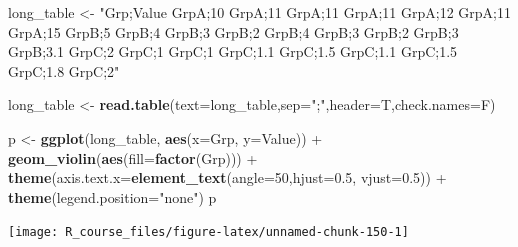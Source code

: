 \documentclass[]{article}
\newenvironment{Shaded}{\begin{snugshade}}{\end{snugshade}}
\newcommand{\KeywordTok}[1]{\textcolor[rgb]{0.13,0.29,0.53}{\textbf{{#1}}}}
\newcommand{\DataTypeTok}[1]{\textcolor[rgb]{0.13,0.29,0.53}{{#1}}}
\newcommand{\DecValTok}[1]{\textcolor[rgb]{0.00,0.00,0.81}{{#1}}}
\newcommand{\FloatTok}[1]{\textcolor[rgb]{0.00,0.00,0.81}{{#1}}}
\newcommand{\StringTok}[1]{\textcolor[rgb]{0.31,0.60,0.02}{{#1}}}
\newcommand{\OtherTok}[1]{\textcolor[rgb]{0.56,0.35,0.01}{{#1}}}
\newcommand{\NormalTok}[1]{{#1}}
\numberwithin{figure}{section}
\numberwithin{table}{section}
\theoremstyle{definition}
\theoremstyle{definition}
\theoremstyle{definition}
\theoremstyle{remark}
\begin{document}
\begin{Shaded}
\begin{Highlighting}[]
\NormalTok{long_table <-}\StringTok{ "Grp;Value}
\StringTok{GrpA;10}
\StringTok{GrpA;11}
\StringTok{GrpA;11}
\StringTok{GrpA;11}
\StringTok{GrpA;12}
\StringTok{GrpA;11}
\StringTok{GrpA;15}
\StringTok{GrpB;5}
\StringTok{GrpB;4}
\StringTok{GrpB;3}
\StringTok{GrpB;2}
\StringTok{GrpB;4}
\StringTok{GrpB;3}
\StringTok{GrpB;2}
\StringTok{GrpB;3}
\StringTok{GrpB;3.1}
\StringTok{GrpC;2}
\StringTok{GrpC;1}
\StringTok{GrpC;1}
\StringTok{GrpC;1.1}
\StringTok{GrpC;1.5}
\StringTok{GrpC;1.1}
\StringTok{GrpC;1.5}
\StringTok{GrpC;1.8}
\StringTok{GrpC;2"}

\NormalTok{long_table <-}\StringTok{ }\KeywordTok{read.table}\NormalTok{(}\DataTypeTok{text=}\NormalTok{long_table,}\DataTypeTok{sep=}\StringTok{";"}\NormalTok{,}\DataTypeTok{header=}\NormalTok{T,}\DataTypeTok{check.names=}\NormalTok{F)}

\NormalTok{p <-}\StringTok{ }\KeywordTok{ggplot}\NormalTok{(long_table, }\KeywordTok{aes}\NormalTok{(}\DataTypeTok{x=}\NormalTok{Grp, }\DataTypeTok{y=}\NormalTok{Value)) +}\StringTok{ }
\KeywordTok{geom_violin}\NormalTok{(}\KeywordTok{aes}\NormalTok{(}\DataTypeTok{fill=}\KeywordTok{factor}\NormalTok{(Grp))) +}\StringTok{ }
\KeywordTok{theme}\NormalTok{(}\DataTypeTok{axis.text.x=}\KeywordTok{element_text}\NormalTok{(}\DataTypeTok{angle=}\DecValTok{50}\NormalTok{,}\DataTypeTok{hjust=}\FloatTok{0.5}\NormalTok{, }\DataTypeTok{vjust=}\FloatTok{0.5}\NormalTok{)) +}
\KeywordTok{theme}\NormalTok{(}\DataTypeTok{legend.position=}\StringTok{"none"}\NormalTok{)}
\NormalTok{p}
\end{Highlighting}
\end{Shaded}

\begin{center}\texttt{[image: R\_course\_files/figure-latex/unnamed-chunk-150-1]} \end{center}

\begin{Shaded}
\end{Shaded}
\end{document}
